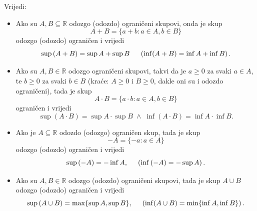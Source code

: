 \begin{remark}
\label{prodsumsupinf}
Vrijedi:
\begin{itemize}
\item[a)] Ako su \(A, B\subseteq \mathbb{R}\) odozgo (odozdo) ograničeni skupovi, onda je skup
\[A+B=\{a+b : a\in A, b\in B\}\]
odozgo (odozdo) ograničen i vrijedi
\[\sup{(A+B)}=\sup{A}+\sup{B}\hspace{0.5cm}\left(\inf(A+B)=\inf{A}+\inf{B}\right).\]
\item[b)] Ako su \(A, B\in \mathbb{R}\) odozgo ograničeni skupovi, takvi da je \(a\geq 0\) za svaki \(a\in A\), te \(b\geq 0\) za svaki \(b\in B\) (kraće: \(A\geq 0\) i \(B\geq 0\), dakle oni su i odozdo ograničeni), tada je skup
\[A\cdot B=\{a\cdot b : a\in A, b\in B\}\]
ograničen i vrijedi
\[\sup{(A\cdot B)}=\sup{A}\cdot \sup{B} \; \wedge \; \inf{(A\cdot B)}=\inf{A}\cdot \inf{B}.\]
\item[c)] Ako je \(A\subseteq \mathbb{R}\) odozdo (odozgo) ograničen skup, tada je skup
\[-A=\{-a : a\in A\}\]
odozgo (odozdo) ograničen i vrijedi
\[\sup{(-A)}=-\inf{A}, \hspace{0.5cm} \left(\inf{(-A)}=-\sup{A}\right).\]
\item[d)] Ako su \(A, B\in \mathbb{R}\) odozgo (odozdo) ograničeni skupovi, tada je skup \(A\cup B\) odozgo (odozdo) ograničen i vrijedi
\[\sup{(A\cup B)}=\max\{\sup{A},\sup{B}\},\hspace{0.5cm} \left(\inf(A\cup B)=\min\{\inf{A}, \inf{B}\}\right).\]
\end{itemize}
\end{remark}

